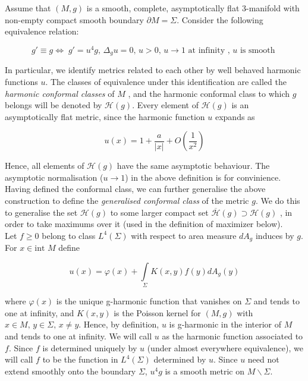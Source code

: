 \documentclass{amsart}
\newcommand{\s}{\Sigma}
\theoremstyle{named}
\begin{document}
Assume that $(M,g)$ is a smooth, complete, asymptotically flat 3-manifold with non-empty compact smooth boundary $\partial M = \Sigma$. Consider the following equivalence relation: 

\begin{equation*}
    g' \equiv g \Leftrightarrow \; g' = u^4g, \, \Delta_g u = 0, \, u > 0, \, u \rightarrow 1 \text{ at infinity }, \, u \text{ is smooth }
\end{equation*}

In particular, we identify metrics related to each other by well behaved harmonic functions $u$. The classes of equivalence under this identification are called the \textit{harmonic conformal classes} of $M$ \cite{bray1999proof}, and the harmonic conformal class to which $g$ belongs will be denoted by $\mathcal{H}(g)$. Every element of $\mathcal{H}(g)$ is an asymptotically flat metric, since the harmonic function $u$ expands as \cite{bartnik_mass} 

\begin{equation*}
    u(x) = 1 + \frac{a}{|x|} + O(\frac{1}{x^2})
\end{equation*}

Hence, all elements of $\mathcal{H}(g)$ have the same asymptotic behaviour. The asymptotic normalisation ($u \rightarrow 1$) in the above definition is for convinience. Having defined the conformal class, we can further generalise the above construction to define the \textit{generalised conformal class} \cite{jeff} of the metric $g$. We do this to generalise the set $\mathcal{H}(g)$ to some larger compact set $\overline{\mathcal{H}}(g) \supset \mathcal{H}(g)$ , in order to take maximums over it (used in the definition of maximizer below). \\ 

Let $f \geq 0$ belong to class $L^4(\Sigma)$ with respect to area measure $dA_g$ induces by $g$. For $x \in \text{int }M$ define 

\begin{equation*}
    u(x) = \varphi(x) + \int\limits_{\s} K(x,y) f(y) dA_g (y)
\end{equation*}

where $\varphi(x)$ is the unique g-harmonic function that vanishes on $\s$ and tends to one  at infinity, and $K(x,y)$ is the Poisson kernel for $(M,g)$ with $x \in M, \, y \in \s, \, x \neq y$. Hence, by definition, $u$ is g-harmonic in the interior of $M$ and tends to one at infinity. We will call $u$ as the harmonic function associated to $f$. Since $f$ is determined uniquely by $u$ (under almost everywhere equivalence), we will call $f$ to be the function in $L^4 (\s)$ determined by $u$. Since $u$ need not extend smoothly onto the boundary $\s$, $u^4g$ is a smooth metric on $M \backslash \s$.
\end{document}
